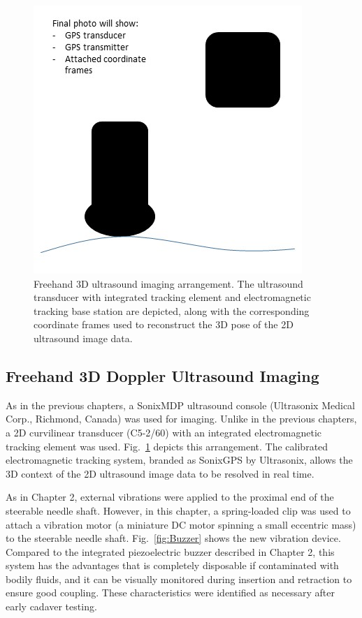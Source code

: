 \begin{figure}[!t]
\centering
\includegraphics[width = 0.4\columnwidth]{./Images/Chapter5/Freehand3DUS/DRAFTFreehand3DUS.jpg}%
\caption[Freehand 3D ultrasound imaging arrangement]{Freehand 3D ultrasound imaging arrangement. The ultrasound transducer with integrated tracking element and electromagnetic tracking base station are depicted, along with the corresponding coordinate frames used to reconstruct the 3D pose of the 2D ultrasound image data.}
\label{fig:freehand3DUS}
\end{figure}  

\subsection{Freehand 3D Doppler Ultrasound Imaging}
As in the previous chapters, a SonixMDP ultrasound console (Ultrasonix Medical Corp., Richmond, Canada) was used for imaging. Unlike in the previous chapters, a 2D curvilinear transducer (C5-2/60) with an integrated electromagnetic tracking element was used. Fig.~\ref{fig:freehand3DUS} depicts this arrangement. The calibrated electromagnetic tracking system, branded as SonixGPS by Ultrasonix, allows the 3D context of the 2D ultrasound image data to be resolved in real time. 

As in Chapter 2, external vibrations were applied to the proximal end of the steerable needle shaft. However, in this chapter, a spring-loaded clip was used to attach a vibration motor (a miniature DC motor spinning a small eccentric mass) to the steerable needle shaft. Fig.~\ref{fig:Buzzer} shows the new vibration device. Compared to the integrated piezoelectric buzzer described in Chapter 2, this system has the advantages that is completely disposable if contaminated with bodily fluids, and it can be visually monitored during insertion and retraction to ensure good coupling. These characteristics were identified as necessary after early cadaver testing.

